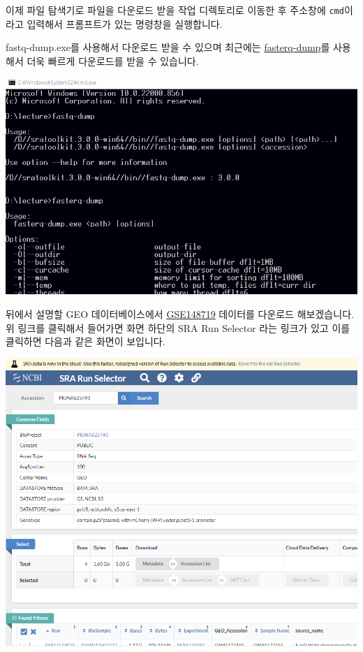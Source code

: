 \documentclass[
]{book}
\begin{document}
이제 파일 탐색기로 파일을 다운로드 받을 작업 디렉토리로 이동한 후 주소창에 \texttt{cmd}이라고 입력해서 프롬프트가 있는 명령창을 실행합니다.

fastq-dump.exe를 사용해서 다운로드 받을 수 있으며 최근에는 \href{https://github.com/ncbi/sra-tools/wiki/HowTo:-fasterq-dump}{fasterq-dump}를 사용해서 더욱 빠르게 다운로드를 받을 수 있습니다.

\includegraphics[width=6.25in,height=\textheight]{images/12/sra.png}

뒤에서 설명할 GEO 데이터베이스에서 \href{https://www.ncbi.nlm.nih.gov/geo/query/acc.cgi?acc=GSE148719}{GSE148719} 데이터를 다운로드 해보겠습니다. 위 링크를 클릭해서 들어가면 화면 하단의 SRA Run Selector 라는 링크가 있고 이를 클릭하면 다음과 같은 화면이 보입니다.

\includegraphics[width=6.25in,height=\textheight]{images/sra.PNG}
\end{document}
